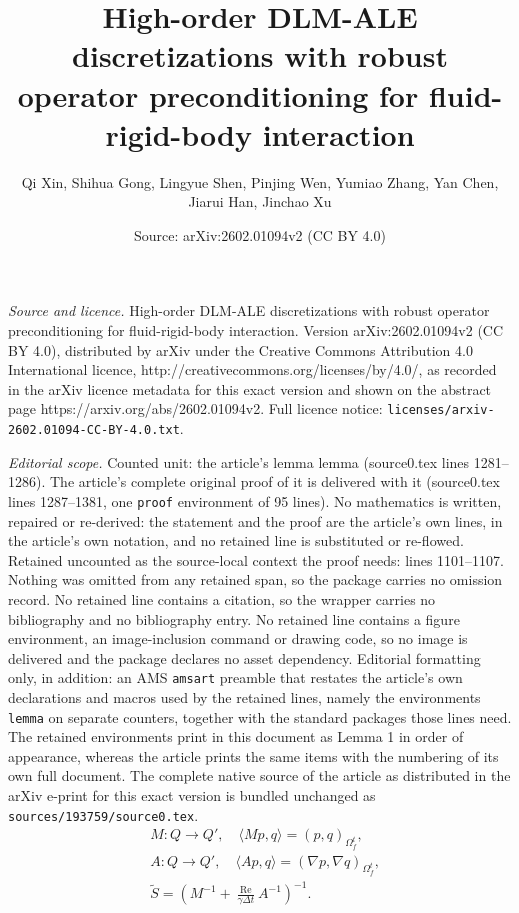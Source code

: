 \documentclass[10pt,a4paper]{amsart}
\title{High-order DLM-ALE discretizations with robust operator preconditioning for fluid-rigid-body interaction}
\author{Qi Xin, Shihua Gong, Lingyue Shen, Pinjing Wen, Yumiao Zhang, Yan Chen, Jiarui Han, Jinchao Xu}
\date{Source: arXiv:2602.01094v2 (CC BY 4.0)}
\newcommand{\Reynolds}{{\operatorname{Re}}}
\begin{document}
\maketitle

\noindent\emph{Source and licence.} High-order DLM-ALE discretizations with robust operator preconditioning for fluid-rigid-body interaction. Version arXiv:2602.01094v2 (CC BY 4.0), distributed by arXiv under the Creative Commons Attribution 4.0 International licence, http://creativecommons.org/licenses/by/4.0/, as recorded in the arXiv licence metadata for this exact version and shown on the abstract page https://arxiv.org/abs/2602.01094v2. Full licence notice: \texttt{licenses/arxiv-2602.01094-CC-BY-4.0.txt}.\par\smallskip

\noindent\textit{Editorial scope.} Counted unit: the article's lemma lemma (source0.tex lines 1281--1286). The article's complete original proof of it is delivered with it (source0.tex lines 1287--1381, one \texttt{proof} environment of 95 lines). No mathematics is written, repaired or re-derived: the statement and the proof are the article's own lines, in the article's own notation, and no retained line is substituted or re-flowed.  Retained uncounted as the source-local context the proof needs: lines 1101--1107.  Nothing was omitted from any retained span, so the package carries no omission record.  No retained line contains a citation, so the wrapper carries no bibliography and no bibliography entry.  No retained line contains a figure environment, an image-inclusion command or drawing code, so no image is delivered and the package declares no asset dependency.  Editorial formatting only, in addition: an AMS \texttt{amsart} preamble that restates the article's own declarations and macros used by the retained lines, namely the environments \texttt{lemma} on separate counters, together with the standard packages those lines need.  The retained environments print in this document as Lemma 1 in order of appearance, whereas the article prints the same items with the numbering of its own full document.  The complete native source of the article as distributed in the arXiv e-print for this exact version is bundled unchanged as \texttt{sources/193759/source0.tex}.
\begin{equation}\label{eq:tildeS}
    \begin{aligned}
        &M: Q \to Q', \quad \langle Mp, q \rangle = (p, q)_{\Omega_f^t}, \\
        &A: Q \to Q', \quad \langle Ap, q \rangle = (\nabla p, \nabla q)_{\Omega_f^t}, \\
        &\tilde{S} = (M^{-1} + \frac{\Reynolds}{\gamma\Delta t} A^{-1})^{-1}.
    \end{aligned}
\end{equation}
\end{document}
